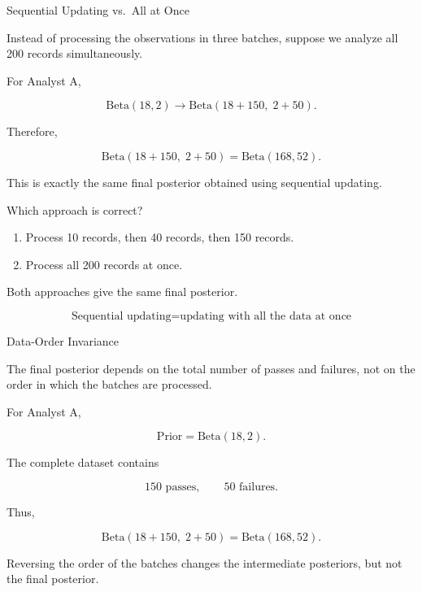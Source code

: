 \documentclass[aspectratio=43]{beamer}
\begin{document}
\begin{frame}{Sequential Updating vs.\ All at Once}

Instead of processing the observations in three batches, suppose
we analyze all 200 records simultaneously.

\vspace{0.3cm}

For Analyst A,

\[
\mathrm{Beta}(18,2)
\longrightarrow
\mathrm{Beta}(18+150,\;2+50).
\]

Therefore,

\[
\mathrm{Beta}(18+150,\;2+50)
=
\mathrm{Beta}(168,52).
\]

\vspace{0.3cm}

This is exactly the same final posterior obtained using
sequential updating.

\end{frame}

\begin{frame}{}

Which approach is correct?

\begin{enumerate}
  \item Process 10 records, then 40 records, then 150 records.
  \item Process all 200 records at once.
\end{enumerate}

\pause

\vspace{0.3cm}

Both approaches give the same final posterior.

\vspace{0.3cm}

\[
\boxed{
\text{Sequential updating}
=
\text{updating with all the data at once}
}
\]

\end{frame}

\begin{frame}{Data-Order Invariance}

The final posterior depends on the total number of passes and
failures, not on the order in which the batches are processed.

\vspace{0.3cm}

For Analyst A,

\[
\text{Prior} = \mathrm{Beta}(18,2).
\]

The complete dataset contains

\[
150 \text{ passes},
\qquad
50 \text{ failures}.
\]

Thus,

\[
\mathrm{Beta}(18+150,\;2+50)
=
\mathrm{Beta}(168,52).
\]

\vspace{0.2cm}

Reversing the order of the batches changes the intermediate
posteriors, but not the final posterior.

\end{frame}
\end{document}
